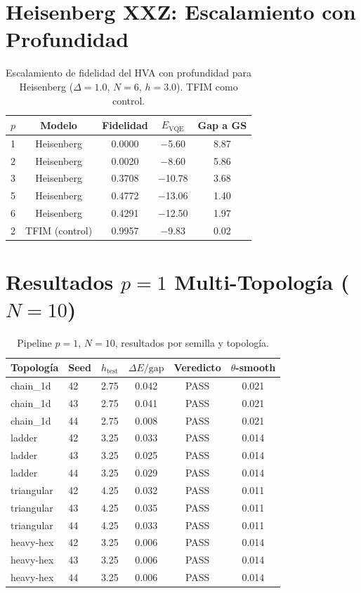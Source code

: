 \documentclass[11pt,a4paper,spanish]{book}
\begin{document}
\section{Heisenberg XXZ: Escalamiento con Profundidad}

\begin{table}[h]
\centering
\caption{Escalamiento de fidelidad del HVA con profundidad para Heisenberg ($\Delta = 1.0$, $N = 6$, $h = 3.0$). TFIM como control.}
\label{tab:app_heisenberg_depth}
\begin{tabular}{lcccc}
\toprule
\textbf{$p$} & \textbf{Modelo} & \textbf{Fidelidad} & \textbf{$E_{\text{VQE}}$} & \textbf{Gap a GS} \\
\midrule
1 & Heisenberg & 0.0000 & $-$5.60 & 8.87 \\
2 & Heisenberg & 0.0020 & $-$8.60 & 5.86 \\
3 & Heisenberg & 0.3708 & $-$10.78 & 3.68 \\
5 & Heisenberg & 0.4772 & $-$13.06 & 1.40 \\
6 & Heisenberg & 0.4291 & $-$12.50 & 1.97 \\
\midrule
2 & TFIM (control) & 0.9957 & $-$9.83 & 0.02 \\
\bottomrule
\end{tabular}
\end{table}

\section{Resultados $p = 1$ Multi-Topología ($N = 10$)}

\begin{table}[h]
\centering
\caption{Pipeline $p = 1$, $N = 10$, resultados por semilla y topología.}
\label{tab:app_p1_detail}
\begin{tabular}{llcccc}
\toprule
\textbf{Topología} & \textbf{Seed} & \textbf{$h_{\text{test}}$} & \textbf{$\Delta E/\text{gap}$} & \textbf{Veredicto} & \textbf{$\theta$-smooth} \\
\midrule
chain\_1d & 42 & 2.75 & 0.042 & PASS & 0.021 \\
chain\_1d & 43 & 2.75 & 0.041 & PASS & 0.021 \\
chain\_1d & 44 & 2.75 & 0.008 & PASS & 0.021 \\
ladder & 42 & 3.25 & 0.033 & PASS & 0.014 \\
ladder & 43 & 3.25 & 0.025 & PASS & 0.014 \\
ladder & 44 & 3.25 & 0.029 & PASS & 0.014 \\
triangular & 42 & 4.25 & 0.032 & PASS & 0.011 \\
triangular & 43 & 4.25 & 0.035 & PASS & 0.011 \\
triangular & 44 & 4.25 & 0.033 & PASS & 0.011 \\
heavy-hex & 42 & 3.25 & 0.006 & PASS & 0.014 \\
heavy-hex & 43 & 3.25 & 0.006 & PASS & 0.014 \\
heavy-hex & 44 & 3.25 & 0.006 & PASS & 0.014 \\
\bottomrule
\end{tabular}
\end{table}
\end{document}

